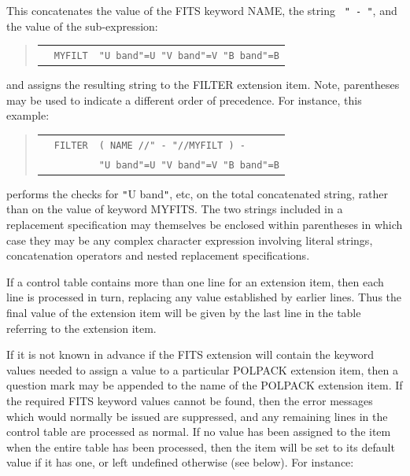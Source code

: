\documentclass[twoside,11pt]{starlink}
\begin{document}
{{      This concatenates the value of the FITS keyword NAME, the string
      \texttt{ " -  "}, and the value of the sub-expression:

\begin{quote}
\begin{tabular}{lll}
              &  \texttt{MYFILT}        & \texttt{"U band"=U "V band"=V "B band"=B}
\end{tabular}
\end{quote}

      and assigns the resulting string to the FILTER extension item.
      Note, parentheses may be used to indicate a different order of
      precedence. For instance, this example:

\begin{quote}
\begin{tabular}{lll}
              &  \texttt{FILTER}        & \texttt{( NAME //" - "//MYFILT ) -} \\
              &                         & \texttt{"U band"=U "V band"=V "B band"=B}
\end{tabular}
\end{quote}

      performs the checks for \texttt{"}U band\texttt{"}, etc, on the total
      concatenated
      string, rather than on the value of keyword MYFITS. The two
      strings included in a replacement specification may themselves be
      enclosed within parentheses in which case they may be any complex
      character expression involving literal strings, concatenation
      operators and nested replacement specifications.

      If a control table contains more than one line for an extension
      item, then each line is processed in turn, replacing any value
      established by earlier lines. Thus the final value of the extension
      item will be given by the last line in the table referring to the
      extension item.

      If it is not known in advance if the FITS extension will contain the
      keyword values needed to assign a value to a particular POLPACK
      extension item, then a question mark may be appended to the name of
      the POLPACK extension item. If the required FITS keyword values
      cannot be found, then the error messages which would normally be
      issued are suppressed, and any remaining lines in the control table
      are processed as normal. If no value has been assigned to the item
      when the entire table has been processed, then the item will be set
      to its default value if it has one, or left undefined otherwise (see
      below). For instance:

}}
\end{document}
